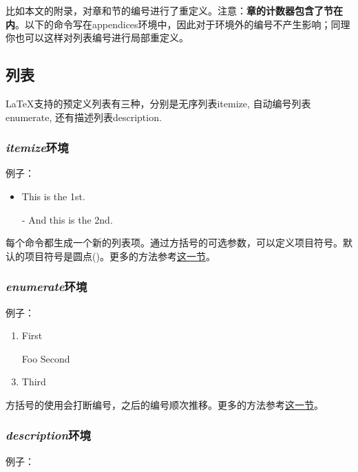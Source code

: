 {比如本文的附录，对章和节的编号进行了重定义。注意：\textbf{章的计数器包含了节在内}。以下的命令写在appendices环境中，因此对于环境外的编号不产生影响；同理你也可以这样对列表编号进行局部重定义。
\begin{latex}{}
\renewcommand{\thechapter}{\Alph{chapter}}
\renewcommand{\thesection}
    {\thechapter-\arabic{section}}
\end{latex}

\subsection{列表}
\LaTeX 支持的预定义列表有三种，分别是无序列表itemize, 自动编号列表enumerate, 还有描述列表description. 

\subsubsection{\textit{itemize}环境}
例子：

\begin{codeshow}
\begin{itemize}
  \item This is the 1st.
  \item[-] And this is the 2nd.
\end{itemize}
\end{codeshow}

每个\latexline{\\item}命令都生成一个新的列表项。通过方括号的可选参数，可以定义项目符号。默认的项目符号是圆点(\latexline{\\textbullet})。更多的方法参考\hyperref[sec:list]{这一节}。

\subsubsection{\textit{enumerate}环境}
例子：

\begin{codeshow}
\begin{enumerate}
  \item First
  \item[Foo] Second
  \item Third
\end{enumerate}
\end{codeshow}

方括号的使用会打断编号，之后的编号顺次推移。更多的方法参考\hyperref[sec:list]{这一节}。

\subsubsection{\textit{description}环境}
例子：

}
